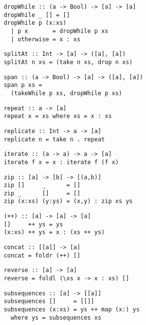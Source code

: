 \begin{multicols}{2}
	\begin{verbatim}
	dropWhile :: (a -> Bool) -> [a] -> [a]
	dropWhile _ [] = []
	dropWhile p (x:xs) 
	  | p x       = dropWhile p xs
	  | otherwise = x : xs
	\end{verbatim}
	
	\begin{verbatim}
	splitAt :: Int -> [a] -> ([a], [a])
	splitAt n xs = (take n xs, drop n xs)
	\end{verbatim}
	
	\begin{verbatim}
	span :: (a -> Bool) -> [a] -> ([a], [a])
	span p xs = 
	  (takeWhile p xs, dropWhile p xs)
	\end{verbatim}
	
	\begin{verbatim}
	repeat :: a -> [a]
	repeat x = xs where xs = x : xs
	\end{verbatim}
	
	\begin{verbatim}
	replicate :: Int -> a -> [a]
	replicate n = take n . repeat
	\end{verbatim}
	
	\begin{verbatim}
	iterate :: (a -> a) -> a -> [a]
	iterate f x = x : iterate f (f x)
	\end{verbatim}
	
	\begin{verbatim}
	zip :: [a] -> [b] -> [(a,b)]
	zip []     _      = []
	zip _      []     = []
	zip (x:xs) (y:ys) = (x,y) : zip xs ys
	\end{verbatim}
	
	\begin{verbatim}
	(++) :: [a] -> [a] -> [a]
	[]     ++ ys = ys
	(x:xs) ++ ys = x : (xs ++ ys)
	\end{verbatim}
	
	\begin{verbatim}
	concat :: [[a]] -> [a]
	concat = foldr (++) []
	\end{verbatim}
	
	\begin{verbatim}
	reverse :: [a] -> [a]
	reverse = foldl (\xs x -> x : xs) []
	\end{verbatim}
	
	\begin{verbatim}
	subsequences :: [a] -> [[a]]
	subsequences []     = [[]]
	subsequences (x:xs) = ys ++ map (x:) ys
	  where ys = subsequences xs
	\end{verbatim}
	

\end{multicols}
